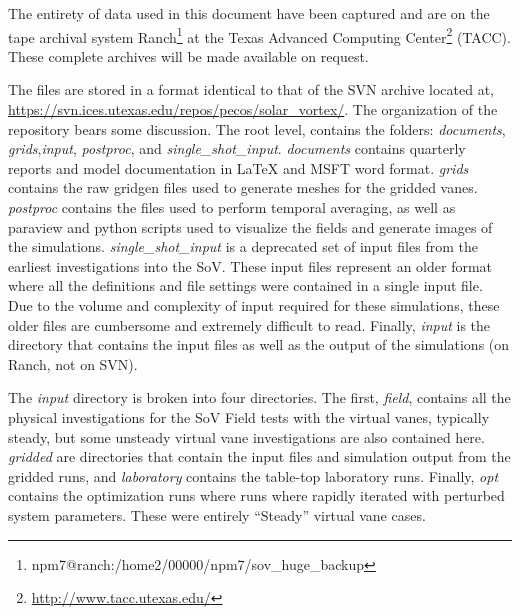 \label{sec:archiving}


The entirety of data used in this document have been captured and
are on the tape archival system
Ranch\footnote{npm7@ranch:/home2/00000/npm7/sov\_huge\_backup} 
at the Texas Advanced Computing Center\footnote{%
    \url{http://www.tacc.utexas.edu/}
}
(TACC).  These complete archives will be made available on request. 

The files are stored in a format identical to that of the SVN archive
located at,
\url{https://svn.ices.utexas.edu/repos/pecos/solar_vortex/}. The
organization of the repository bears some discussion. The root level,
contains the folders: {\it documents}, {\it grids},{\it input}, {\it
postproc}, and {\it single\_shot\_input}. {\it documents} contains
quarterly reports and model documentation in LaTeX and MSFT word format.  
{\it grids} contains the raw gridgen files used to generate meshes for
the gridded vanes. {\it postproc} contains the files used to perform
temporal averaging, as well as paraview and python scripts used to
visualize the fields and generate images of the simulations. {\it
single\_shot\_input} is a deprecated set of input files from the
earliest investigations into the SoV. These input files represent an
older format where all the definitions and file settings were contained
in a single input file. Due to the volume and complexity of input
required for these simulations, these older files are cumbersome and
extremely difficult to read. Finally, {\it input} is the directory that
contains the input files as well as the output of the simulations (on
Ranch, not on SVN). 

The {\it input} directory is broken into four directories. The first,
{\it field}, contains all the physical investigations for the SoV Field
tests with the virtual vanes, typically steady, but some unsteady
virtual vane investigations are also contained here. {\it gridded} are
directories that contain the input files and simulation output from the
gridded runs, and {\it laboratory} contains the table-top laboratory
runs. Finally, {\it opt} contains the optimization runs where runs where
rapidly iterated with perturbed system parameters. These were entirely
``Steady'' virtual vane cases. 

